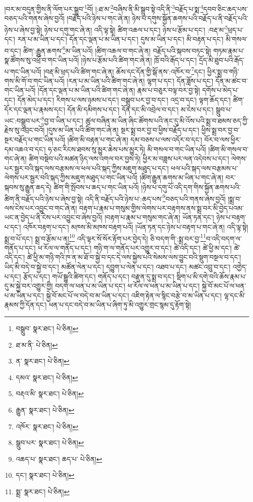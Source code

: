 །བར་མ་བདུན་གྱིས་ནི་ལོག་པར་སྒྲུབ་\footnote{བསྒྲུབ་  སྣར་ཐང་།  པེ་ཅིན། }བོ། །:ཐ་མ་\footnote{ཐ་མ་ནི་  པེ་ཅིན། }བཞིས་ནི་མི་སྒྲུབ་སྟེ་འདི་ནི་\footnote{ན་  སྣར་ཐང་།  པེ་ཅིན། }བརྗོད་པ་སྨ་\footnote{དམའ་  སྣར་ཐང་།  པེ་ཅིན། }དབབ་ཅིང་ཆད་པས་བཅད་པའི་གནས་ཞེས་བྱའོ། །བརྗོད་པའི་ཉེས་པ་གང་ཞེ་ན། ཉེས་པ་དགུས་སྐྱོན་ཆགས་པའི་བརྗོད་པ་ནི་བརྗོད་པའི་ཉེས་པ་ཞེས་བྱ་སྟེ། ཉེས་པ་དགུ་གང་ཞེ་ན། འདི་ལྟ་སྟེ། ཚིག་འཆལ་པ་དང་། ཉེས་པ་རྩོམ་པ་དང་། :བརྡ་མ་\footnote{བརྡའ་མི་  སྣར་ཐང་།  པེ་ཅིན། }ཕྲད་པ་དང་། རན་པ་མ་ཡིན་པ་དང་། དོན་དང་ལྡན་པ་མ་ཡིན་པ་དང་། དུས་མ་ཡིན་པ་དང་། མི་བརྟན་པ་དང་། མི་གསལ་བ་དང་། ཚིག་:རྒྱུན་ཆགས་\footnote{རྒྱུན་  སྣར་ཐང་།  པེ་ཅིན། }མ་ཡིན་པའོ། །ཚིག་འཆལ་བ་གང་ཞེ་ན། བརྗོད་པའི་སྐབས་བཏང་སྟེ། གཏམ་རྣམ་པ་སྣ་ཚོགས་སུ་འཕྲོ་བ་གང་ཡིན་པའོ། །ཉེས་པ་རྩོམ་པའི་ཚིག་གང་ཞེ་ན། ཁྲོ་བའི་རྒོད་པ་དང་། དྲོད་མི་ཐུབ་པའི་རྒོད་པ་གང་ཡིན་པའོ། །བརྡ་མི་ཕྲད་པའི་ཚིག་གང་ཞེ་ན། ཆོས་དང་དོན་གྱི་སྒོ་ནས་:འཁོར་བ་\footnote{འཁོར་  སྣར་ཐང་།  པེ་ཅིན། }དང་། ཕྱིར་སྨྲ་བ་གཉི་གས་མི་གོ་བ་གང་ཡིན་པའོ། །རན་པ་མ་ཡིན་པའི་ཚིག་གང་ཞེ་ན། ལྷག་པ་དང་། དོན་ཟློས་པ་དང་། དོན་མ་ཚང་བ་གང་ཡིན་པའོ། །དོན་དང་ལྡན་པ་མ་ཡིན་པའི་ཚིག་གང་ཞེ་ན། རྣམ་པ་བཅུར་བལྟ་བར་བྱ་སྟེ། དགོས་པ་མེད་པ་དང་། དོན་མེད་པ་དང་། རིགས་པ་ལས་ཉམས་པ་དང་། བསྒྲུབ་པར་བྱ་བ་དང་། འདྲ་བ་དང་། ལྟག་ཆོད་དང་། ཚིག་དོར་དང་ལྡན་པ་རྣམས་དང་། དོན་མི་དམིགས་པ་དང་། དོན་དང་མི་འབྲེལ་བ་དང་། མ་ངེས་པ་དང་། སྒྲུབ་པ་ཡང་:བསྒྲུབ་པར་\footnote{སྒྲུབ་པར་  སྣར་ཐང་།  པེ་ཅིན། }བྱ་བ་ཡིན་པ་དང་། ཚུལ་བཞིན་མ་ཡིན་ཞིང་ཚོགས་པའི་ནང་དུ་མི་འོས་པའི་སྨྲ་བ་ཐམས་ཅད་ཀྱི་རྗེས་སུ་འབྲང་བའོ། །དུས་མ་ཡིན་པའི་ཚིག་གང་ཞེ་ན། སྔར་སྨྲ་བར་བྱ་བ་ཕྱིས་བརྗོད་པ་དང་། ཕྱིས་སྨྲ་བར་བྱ་བ་སྔར་བརྗོད་པ་གང་ཡིན་པའོ། །ཚིག་མི་བརྟན་པ་གང་ཞེ་ན། དམ་བཅས་པ་ལས་འདོར་བ་དང་། བོར་བ་ལས་ཕྱིར་དམ་འཆའ་བ་དང་། ཧ་ཅང་རིངས་ཐབས་སུ་མྱུར་ཆེས་པས་མྱུར་ཏེ། མི་གསལ་བ་གང་ཡིན་པའོ། །ཚིག་མི་གསལ་བ་གང་ཞེ་ན། ཚིག་བསྡེབ་པའི་མཚན་ཉིད་ལས་འགལ་བར་བྱས་ཏེ། ཕྱིར་མ་བཟླས་པར་ལན་འདེབས་པ་དང་། ལེགས་པར་སྦྱར་བའི་སྐད་ལས་བརྩམས་ལ་ཕལ་པའི་སྐད་ཀྱིས་མཇུག་མཐུད་པ་དང་། ཕལ་པའི་སྐད་ལས་བརྩམས་པ་ལེགས་པར་སྦྱར་བའི་སྐད་ཀྱིས་མཇུག་མཐུད་པ་གང་ཡིན་པའོ། །ཚིག་རྒྱུན་ཆགས་མ་ཡིན་པ་གང་ཞེ་ན། བར་སྐབས་སུ་རྒྱུན་ཆད་དེ། ཚིག་གི་སྤོབས་པ་ཆད་པ་གང་ཡིན་པའོ། །ཉེས་པ་དགུ་པོ་འདི་དག་གིས་སྐྱོན་ཆགས་པའི་ཚིག་ནི་བརྗོད་པའི་ཉེས་པ་ཞེས་བྱ་སྟེ། འདི་ནི་བརྗོད་པའི་ཉེས་པ་:ཆད་པས་\footnote{འཆད་པ་  སྣར་ཐང་། ཆད་པ་  པེ་ཅིན། }བཅད་པའི་གནས་ཞེས་བྱའོ། །སྨྲ་བ་ལས་ངེས་པར་འབྱུང་བ་གང་ཞེ་ན། བརྟག་པ་རྣམ་པ་གསུམ་གྱིས་ལེགས་པར་བརྟགས་ནས་སྨྲ་བར་མི་བྱེད་པའམ་ཡང་ན་བྱེད་པ་ནི་ངེས་པར་འབྱུང་བ་ཞེས་བྱའོ། །བརྟག་པ་རྣམ་པ་གསུམ་གང་ཞེ་ན། ཡོན་ཏན་དང་། ཉེས་པ་བརྟག་པ་དང་། འཁོར་བརྟག་པ་དང་། མཁས་མི་མཁས་བརྟག་པའོ། །ཡོན་ཏན་དང་ཉེས་པ་བརྟག་པ་གང་ཞེ་ན། འདི་ལྟ་སྟེ། སྨྲ་བ་པོ་དང་། སྨྲ་བ་རྩོམ་པ་ན།\footnote{དང་།  སྣར་ཐང་།  པེ་ཅིན། } འདི་ལྟར་སོ་སོར་རྟོག་པར་བྱེད་དེ། ཅི་བདག་གི་:སྨྲ་བར་བྱ་\footnote{སྨྲ་  སྣར་ཐང་།  པེ་ཅིན། }བ་འདི་བདག་ལ་གནོད་པ་དང་། ཕ་རོལ་ལ་གནོད་པ་དང་། གཉི་ག་ལ་གནོད་པར་འགྱུར་བ་དང་། ཚེ་འདི་དང་། ཚེ་ཕྱི་མ་དང་། ཚེ་འདི་དང་། ཚེ་ཕྱི་མ་གཉི་གའི་ཁ་ན་མ་ཐོ་བ་སྐྱེ་བ་དང་དེ་ལས་སྐྱེས་པའི་སེམས་ལས་བྱུང་བའི་སྡུག་བསྔལ་བ་དང་། ཡིད་མི་བདེ་བ་སྐྱེ་བ་དང་། མཚོན་ལེན་པ་དང་། དབྱུག་པ་ལེན་པ་དང་། འཐབ་པ་དང་། མཚང་འབྲུ་བ་དང་། འགྱེད་པ་དང་། རྩོད་པ་དང་། གཡོ་སྒྱུའི་ཚིག་དང་། གནོད་པ་དང་། བརྫུན་དུ་སྨྲ་བ་དང་། སྡིག་པ་མི་དགེ་བའི་ཆོས་རྣམ་པ་དུ་མ་སྐྱེ་བར་འགྱུར་གྱི། བདག་ལ་ཕན་པ་མ་ཡིན་པ་དང་། ཕ་རོལ་ལ་ཕན་པ་མ་ཡིན་པ་དང་། སྐྱེ་བོ་མང་པོ་ལ་ཕན་པ་མ་ཡིན་པ་དང་། སྐྱེ་བོ་མང་པོ་ལ་བདེ་བ་མ་ཡིན་པ་དང་། འཇིག་རྟེན་ལ་སྙིང་བརྩེ་བ་མ་ཡིན་པ་དང་། ལྷ་དང་མི་རྣམས་ཀྱི་དོན་དང་། ཕན་པ་དང་བདེ་བ་མ་ཡིན་པ་ཞིག་ཏུ་མི་འགྱུར་གྲང་སྙམ་དུ་རྟོག་སྟེ། 